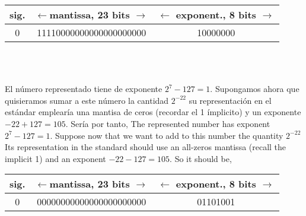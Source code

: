 \begin{minipage}{\textwidth}
	\centering	
\begin{tabular}{|c||c||c|}
\hline
sig.&$\leftarrow$mantissa, 23 bits $\rightarrow$&$\leftarrow$ exponent., 8 bits $\rightarrow$\\
\hline
0&11110000000000000000000&10000000\\
\hline
\end{tabular}\\
\ \\
\end{minipage}
\begin{paracol}{2}
El número representado tiene de exponente $2^7-127=1$. Supongamos ahora que quisieramos sumar a este número la cantidad $2^{-22}$ su representación en el estándar emplearía una mantisa de ceros (recordar el 1 ímplicito) y un exponente $-22+127=105$. Sería por tanto,
\switchcolumn
The represented number has exponent $2^7-127=1$. Suppose now that we want to add to this number the quantity $2^{-22}$ Its representation in the standard should use an all-zeros mantissa (recall the implicit 1) and an exponent $-22-127 = 105$. So it should be,
\end{paracol}
\begin{minipage}{\textwidth}
	\centering	
\begin{tabular}{|c||c||c|}
\hline
sig.&$\leftarrow$mantissa, 23 bits $\rightarrow$&$\leftarrow$ exponent., 8 bits $\rightarrow$\\
\hline
0&00000000000000000000000&01101001\\
\hline
\end{tabular}\\
\ \\
\end{minipage}
